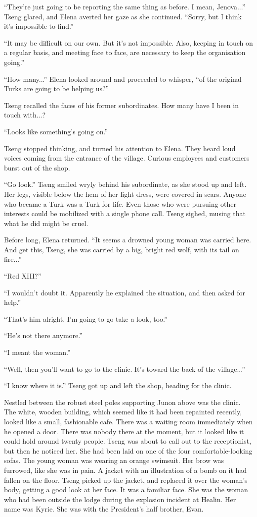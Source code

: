 \documentclass[oneside]{book}
\begin{document}
“They’re just going to be reporting the same thing as before. I mean, Jenova...” Tseng glared, and Elena averted her gaze as she continued. “Sorry, but I think it’s impossible to find.”

“It may be difficult on our own. But it’s not impossible. Also, keeping in touch on a regular basis, and meeting face to face, are necessary to keep the organisation going.”

“How many...” Elena looked around and proceeded to whisper, “of the original Turks are going to be helping us?”

Tseng recalled the faces of his former subordinates. How many have I been in touch with...?

“Looks like something’s going on.”

Tseng stopped thinking, and turned his attention to Elena. They heard loud voices coming from the entrance of the village. Curious employees and customers burst out of the shop.

“Go look.” Tseng smiled wryly behind his subordinate, as she stood up and left. Her legs, visible below the hem of her light dress, were covered in scars. Anyone who became a Turk was a Turk for life. Even those who were pursuing other interests could be mobilized with a single phone call. Tseng sighed, musing that what he did might be cruel.

Before long, Elena returned. “It seems a drowned young woman was carried here. And get this, Tseng, she was carried by a big, bright red wolf, with its tail on fire...”

“Red XIII?”

“I wouldn’t doubt it. Apparently he explained the situation, and then asked for help.”

“That’s him alright. I’m going to go take a look, too.”

“He’s not there anymore.”

“I meant the woman.”

“Well, then you’ll want to go to the clinic. It’s toward the back of the village...”

“I know where it is.” Tseng got up and left the shop, heading for the clinic.

Nestled between the robust steel poles supporting Junon above was the clinic. The white, wooden building, which seemed like it had been repainted recently, looked like a small, fashionable cafe. There was a waiting room immediately when he opened a door. There was nobody there at the moment, but it looked like it could hold around twenty people. Tseng was about to call out to the receptionist, but then he noticed her. She had been laid on one of the four comfortable-looking sofas. The young woman was wearing an orange swimsuit. Her brow was furrowed, like she was in pain. A jacket with an illustration of a bomb on it had fallen on the floor. Tseng picked up the jacket, and replaced it over the woman’s body, getting a good look at her face. It was a familiar face. She was the woman who had been outside the lodge during the explosion incident at Healin. Her name was Kyrie. She was with the President’s half brother, Evan.
\end{document}
